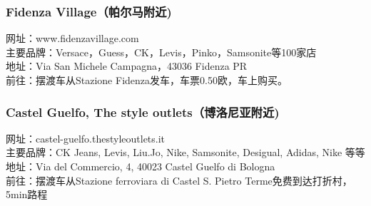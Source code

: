 \begin{multicols}{2}
\subsubsection{Fidenza Village（帕尔马附近)}
\noindent 网址：www.fidenzavillage.com\\
主要品牌：Versace，Guess，CK，Levis，Pinko，Samsonite等100家店\\
地址：Via San Michele Campagna，43036 Fidenza PR\\
前往：摆渡车从Stazione Fidenza发车，车票0.50欧，车上购买。

\subsubsection{Castel Guelfo, The style outlets（博洛尼亚附近)}
\noindent 网址：castel-guelfo.thestyleoutlets.it\\
主要品牌：CK Jeans, Levis, Liu.Jo, Nike, Samsonite, Desigual, Adidas, Nike 等等\\
地址：Via del Commercio, 4, 40023 Castel Guelfo di Bologna\\
前往：摆渡车从Stazione ferroviara di Castel S. Pietro Terme免费到达打折村，5min路程

\end{multicols}